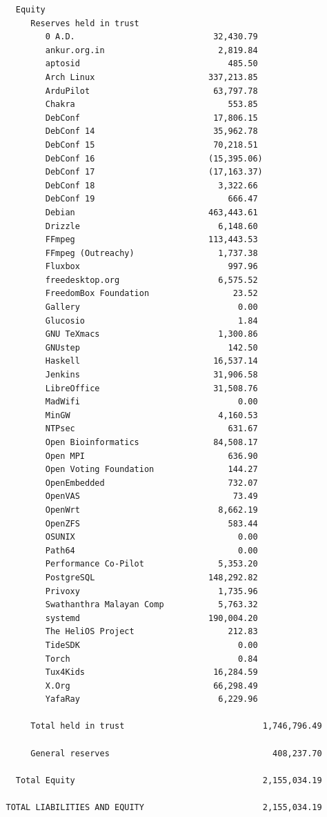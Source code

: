 \documentclass[a4paper]{report}
\begin{document}
\begin{verbatim}
     Equity
        Reserves held in trust
           0 A.D.                            32,430.79
           ankur.org.in                       2,819.84
           aptosid                              485.50
           Arch Linux                       337,213.85
           ArduPilot                         63,797.78
           Chakra                               553.85
           DebConf                           17,806.15
           DebConf 14                        35,962.78
           DebConf 15                        70,218.51
           DebConf 16                       (15,395.06)
           DebConf 17                       (17,163.37)
           DebConf 18                         3,322.66
           DebConf 19                           666.47
           Debian                           463,443.61
           Drizzle                            6,148.60
           FFmpeg                           113,443.53
           FFmpeg (Outreachy)                 1,737.38
           Fluxbox                              997.96
           freedesktop.org                    6,575.52
           FreedomBox Foundation                 23.52
           Gallery                                0.00
           Glucosio                               1.84
           GNU TeXmacs                        1,300.86
           GNUstep                              142.50
           Haskell                           16,537.14
           Jenkins                           31,906.58
           LibreOffice                       31,508.76
           MadWifi                                0.00
           MinGW                              4,160.53
           NTPsec                               631.67
           Open Bioinformatics               84,508.17
           Open MPI                             636.90
           Open Voting Foundation               144.27
           OpenEmbedded                         732.07
           OpenVAS                               73.49
           OpenWrt                            8,662.19
           OpenZFS                              583.44
           OSUNIX                                 0.00
           Path64                                 0.00
           Performance Co-Pilot               5,353.20
           PostgreSQL                       148,292.82
           Privoxy                            1,735.96
           Swathanthra Malayan Comp           5,763.32
           systemd                          190,004.20
           The HeliOS Project                   212.83
           TideSDK                                0.00
           Torch                                  0.84
           Tux4Kids                          16,284.59
           X.Org                             66,298.49
           YafaRay                            6,229.96

        Total held in trust                            1,746,796.49

        General reserves                                 408,237.70

     Total Equity                                      2,155,034.19

   TOTAL LIABILITIES AND EQUITY                        2,155,034.19
\end{verbatim}
\end{document}
